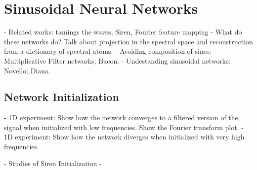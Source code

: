 \section{Sinusoidal Neural Networks}

- Related works: tamings the waves, Siren, Fourier feature mapping
- What do these networks do? Talk about projection in the spectral space and reconstruction from a dictionary of spectral atoms.
- Avoiding composition of sines: Multiplicative Filter networks; Bacon.
- Undestanding sinusoidal networks: Novello; Diana.

\subsection{Network Initialization}

- 1D experiment: Show how the network converges to a filtered version of the signal when initialized with low frequencies. Show the Fourier transform plot.
- 1D experiment: Show how the network diverges when initialized with very high frequencies.

- Studies of Siren Initialization
- 